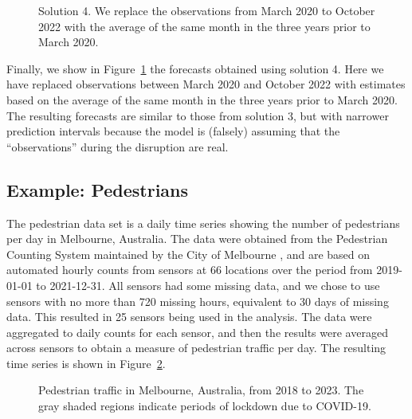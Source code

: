 \documentclass[11pt,a4paper,]{article}
\begin{document}
\begin{figure}[t]


\caption{\label{fig-tsol4-plot}Solution 4. We replace the observations
from March 2020 to October 2022 with the average of the same month in
the three years prior to March 2020.}

\end{figure}%

Finally, we show in Figure~\ref{fig-tsol4-plot} the forecasts obtained
using solution 4. Here we have replaced observations between March 2020
and October 2022 with estimates based on the average of the same month
in the three years prior to March 2020. The resulting forecasts are
similar to those from solution 3, but with narrower prediction intervals
because the model is (falsely) assuming that the ``observations'' during
the disruption are real.

\FloatBarrier

\subsection{Example: Pedestrians}\label{example-pedestrians}

The pedestrian data set is a daily time series showing the number of
pedestrians per day in Melbourne, Australia. The data were obtained from
the Pedestrian Counting System maintained by the City of Melbourne
\autocite{pedestrians}, and are based on automated hourly counts from
sensors at 66 locations over the period from 2019-01-01 to 2021-12-31.
All sensors had some missing data, and we chose to use sensors with no
more than 720 missing hours, equivalent to 30 days of missing data. This
resulted in 25 sensors being used in the analysis. The data were
aggregated to daily counts for each sensor, and then the results were
averaged across sensors to obtain a measure of pedestrian traffic per
day. The resulting time series is shown in Figure~\ref{fig-walkers}.

\begin{figure}


\caption{\label{fig-walkers}Pedestrian traffic in Melbourne, Australia,
from 2018 to 2023. The gray shaded regions indicate periods of lockdown
due to COVID-19.}

\end{figure}%
\end{document}
